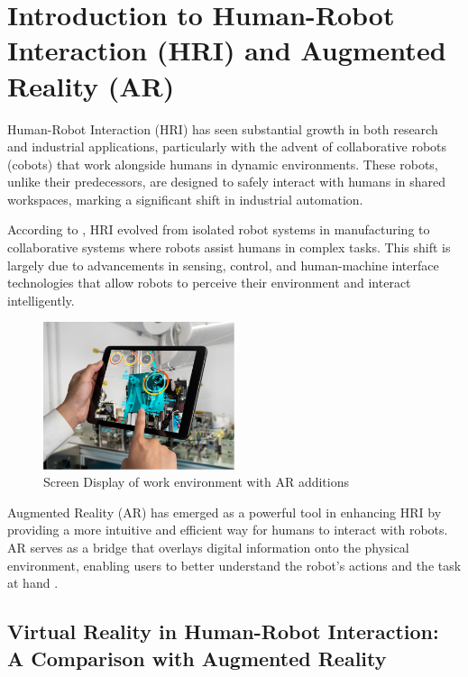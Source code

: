 \section{Introduction to Human-Robot Interaction (HRI) and Augmented Reality (AR)}

Human-Robot Interaction (HRI) has seen substantial growth in both research and industrial applications, particularly with the advent of collaborative robots (cobots) that work alongside humans in dynamic environments. These robots, unlike their predecessors, are designed to safely interact with humans in shared workspaces, marking a significant shift in industrial automation. 

According to \cite{Hentout2019}, HRI evolved from isolated robot systems in manufacturing to collaborative systems where robots assist humans in complex tasks. This shift is largely due to advancements in sensing, control, and human-machine interface technologies that allow robots to perceive their environment and interact intelligently.

\begin{figure}[ht]
    \centering
    \includegraphics[width=0.5\textwidth]{ch2/figs/overlay.png}
    \caption{Screen Display of work environment with AR additions \cite{ResearchGateAR2024}}
    \label{fig:AR_work_overlay}
\end{figure}

Augmented Reality (AR) has emerged as a powerful tool in enhancing HRI by providing a more intuitive and efficient way for humans to interact with robots. AR serves as a bridge that overlays digital information onto the physical environment, enabling users to better understand the robot’s actions and the task at hand \cite{Suzuki2022}. 

\subsection{Virtual Reality in Human-Robot Interaction: A Comparison with Augmented Reality}

